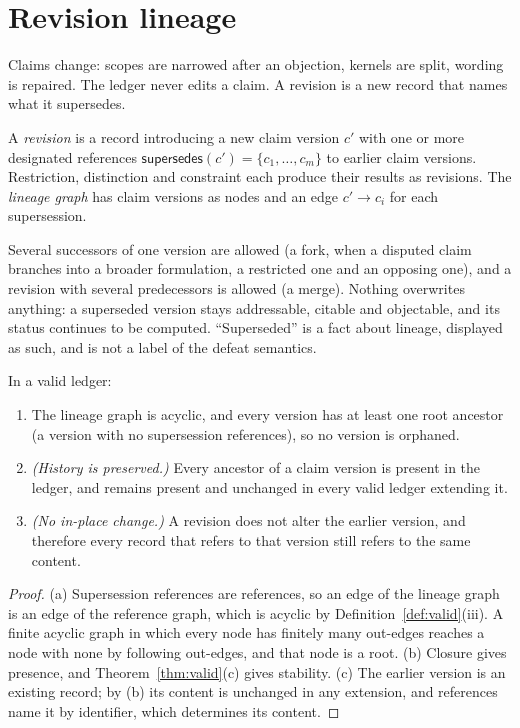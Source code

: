 \section{Revision lineage}

Claims change: scopes are narrowed after an objection, kernels are split, wording is repaired. The ledger never edits a claim. A revision is a new record that names what it supersedes.

\begin{definition}\label{def:lineage}
A \emph{revision} is a record introducing a new claim version $c'$ with one or more designated references $\mathsf{supersedes}(c')=\{c_1,\dots,c_m\}$ to earlier claim versions. Restriction, distinction and constraint each produce their results as revisions. The \emph{lineage graph} has claim versions as nodes and an edge $c'\to c_i$ for each supersession.
\end{definition}

Several successors of one version are allowed (a fork, when a disputed claim branches into a broader formulation, a restricted one and an opposing one), and a revision with several predecessors is allowed (a merge). Nothing overwrites anything: a superseded version stays addressable, citable and objectable, and its status continues to be computed. ``Superseded'' is a fact about lineage, displayed as such, and is not a label of the defeat semantics.

\begin{theorem}\label{thm:lineage}
In a valid ledger:
\begin{enumerate}[label=(\alph*)]
\item The lineage graph is acyclic, and every version has at least one root ancestor (a version with no supersession references), so no version is orphaned.
\item \emph{(History is preserved.)} Every ancestor of a claim version is present in the ledger, and remains present and unchanged in every valid ledger extending it.
\item \emph{(No in-place change.)} A revision does not alter the earlier version, and therefore every record that refers to that version still refers to the same content.
\end{enumerate}
\end{theorem}

\begin{proof}
(a) Supersession references are references, so an edge of the lineage graph is an edge of the reference graph, which is acyclic by Definition~\ref{def:valid}(iii). A finite acyclic graph in which every node has finitely many out-edges reaches a node with none by following out-edges, and that node is a root. (b) Closure gives presence, and Theorem~\ref{thm:valid}(c) gives stability. (c) The earlier version is an existing record; by (b) its content is unchanged in any extension, and references name it by identifier, which determines its content.
\end{proof}

